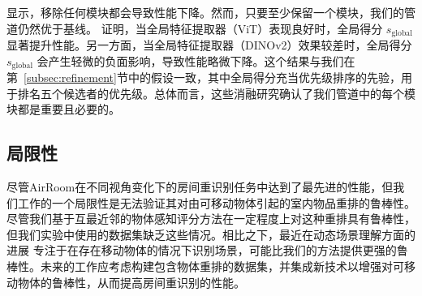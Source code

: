  显示，移除任何模块都会导致性能下降。然而，只要至少保留一个模块，我们的管道仍然优于基线。  证明，当全局特征提取器（ViT）表现良好时，全局得分 \(s_{\text{global}}\) 显著提升性能。另一方面，当全局特征提取器（DINOv2）效果较差时，全局得分 \(s_{\text{global}}\) 会产生轻微的负面影响，导致性能略微下降。这个结果与我们在第~\ref{subsec:refinement}节中的假设一致，其中全局得分充当优先级排序的先验，用于排名五个候选者的优先级。总体而言，这些消融研究确认了我们管道中的每个模块都是重要且必要的。
\subsection{局限性}

尽管AirRoom在不同视角变化下的房间重识别任务中达到了最先进的性能，但我们工作的一个局限性是无法验证其对由可移动物体引起的室内物品重排的鲁棒性。尽管我们基于互最近邻的物体感知评分方法在一定程度上对这种重排具有鲁棒性，但我们实验中使用的数据集缺乏这些情况。相比之下，最近在动态场景理解方面的进展 \cite{zhao2024dynamicsceneunderstandingobjectcentric} 专注于在存在移动物体的情况下识别场景，可能比我们的方法提供更强的鲁棒性。未来的工作应考虑构建包含物体重排的数据集，并集成新技术以增强对可移动物体的鲁棒性，从而提高房间重识别的性能。
